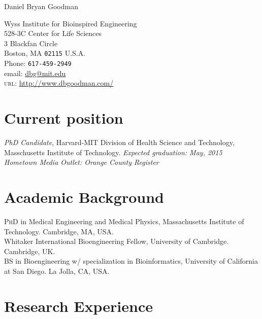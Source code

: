 \documentclass[11pt, letterpaper]{article}
\newcommand{\years}[1]{\marginnote{\scriptsize #1}}
\begin{document}

\textsf{\LARGE Daniel Bryan Goodman}\\[1cm]
\begin{multicols}{2}
Wyss Institute for Bioinspired \mbox{Engineering}\\
528-3C Center for Life Sciences\\
3 Blackfan Circle\\
Boston, MA \texttt{02115}
U.S.A.\\[.2cm]

Phone: \texttt{617-459-2949}\\
email: \href{mailto:dbg@mit.edu}{dbg@mit.edu}\\
\textsc{url}: \href{http://www.dbgoodman.com/}{http://www.dbgoodman.com/}\\
\end{multicols}

\section*{Current position}
\emph{PhD Candidate}, Harvard-MIT Division of Health Science and Technology, Masschusetts Institute of Technology. \emph{Expected graduation: May, 2015}
\\[2mm]
\emph{Hometown Media Outlet: Orange County Register}

\section*{Academic Background}

\years{2015}\textsc{PhD} in Medical Engineering and Medical Physics, Massachusetts Institute of Technology. Cambridge, MA, USA. \\

\noindent\years{2008-2009}Whitaker International Bioengineering Fellow, University of Cambridge. Cambridge, UK.\\

\noindent\years{2008}\textsc{BS} in Bioengineering w/ specialization in Bioinformatics, University of California at San Diego. La Jolla, CA, USA.\\


\section*{Research Experience}
\end{document}
